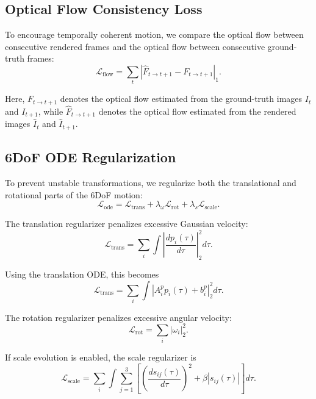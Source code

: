 \documentclass[11pt]{article}
\begin{document}
\subsection{Optical Flow Consistency Loss}

To encourage temporally coherent motion, we compare the optical flow between consecutive rendered frames and the optical flow between consecutive ground-truth frames:
\begin{equation}
\mathcal{L}_{\text{flow}} = \sum_t \left| \hat F_{t\to t+1} - F_{t\to t+1} \right|_1.
\end{equation}

Here, $F_{t\to t+1}$ denotes the optical flow estimated from the ground-truth images $I_t$ and $I_{t+1}$, while $\hat F_{t\to t+1}$ denotes the optical flow estimated from the rendered images $\hat I_t$ and $\hat I_{t+1}$.

\subsection{6DoF ODE Regularization}

To prevent unstable transformations, we regularize both the translational and rotational parts of the 6DoF motion:
\begin{equation}
\mathcal{L}_{\text{ode}} = \mathcal{L}_{\text{trans}} + \lambda_{\omega}\mathcal{L}_{\text{rot}} + \lambda_s\mathcal{L}_{\text{scale}}.
\end{equation}

The translation regularizer penalizes excessive Gaussian velocity:
\begin{equation}
\mathcal{L}_{\text{trans}} = \sum_i \int \left| \frac{d p_i(\tau)}{d\tau} \right|_2^2 d\tau.
\end{equation}

Using the translation ODE, this becomes
\begin{equation}
\mathcal{L}_{\text{trans}} = \sum_i \int \left| A_i^p p_i(\tau)+b_i^p \right|_2^2 d\tau.
\end{equation}

The rotation regularizer penalizes excessive angular velocity:
\begin{equation}
\mathcal{L}_{\text{rot}} = \sum_i \left| \omega_i \right|_2^2.
\end{equation}

If scale evolution is enabled, the scale regularizer is
\begin{equation}
\mathcal{L}_{\text{scale}} = \sum_i \int \sum_{j=1}^3 \left[ \left( \frac{d s_{ij}(\tau)}{d\tau} \right)^2 + \beta |s_{ij}(\tau)| \right] d\tau.
\end{equation}
\end{document}
